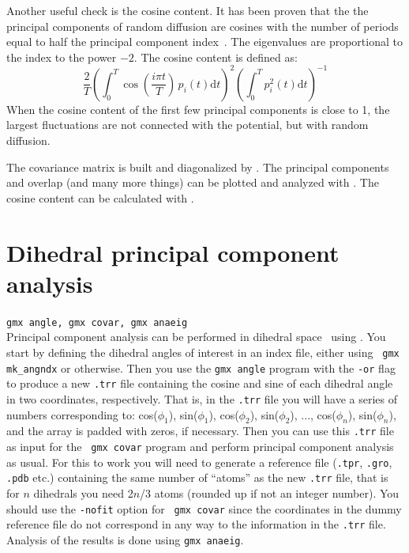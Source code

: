Another useful check is the cosine content. It has been proven that the
the principal components of random diffusion are cosines with the number of
periods equal to half the principal component index~\cite{Hess2000,Hess2002b}.
The eigenvalues are proportional to the index to the power $-2$.
The cosine content is defined as:
\begin{equation}
\frac{2}{T}
\left( \int_0^T \cos\left(\frac{i \pi t}{T}\right) \, p_i(t) \mbox{d} t \right)^2
\left( \int_0^T p_i^2(t) \mbox{d} t \right)^{-1}
\end{equation}
When the cosine content of the first few principal components
is close to 1, the largest fluctuations are not connected with
the potential, but with random diffusion.

The covariance matrix is built and diagonalized by
{\tt {}}.
The principal components and overlap (and many more things)
can be plotted and analyzed with {\tt {}}.
The cosine content can be calculated with {\tt {}}.



\section{Dihedral principal component analysis}
{\tt gmx angle, gmx covar, gmx anaeig}\\
Principal component analysis can be performed in dihedral
space~\cite{Mu2005a} using {\gromacs}. You start by defining the
dihedral angles of interest in an index file, either using {\tt
 gmx mk_angndx} or otherwise. Then you use the {\tt gmx angle} program
with the {\tt -or} flag to produce a new {\tt .trr} file containing the cosine and
sine of each dihedral angle in two coordinates, respectively. That is,
in the {\tt .trr} file you will have a series of numbers corresponding to:
cos($\phi_1$), sin($\phi_1$), cos($\phi_2$), sin($\phi_2$), ...,
cos($\phi_n$), sin($\phi_n$), and the array is padded with zeros, if
necessary.  Then you can use this {\tt .trr} file as input for the {\tt
 gmx covar} program and perform principal component analysis as usual.
For this to work you will need to generate a reference file ({\tt .tpr}, 
{\tt .gro}, {\tt .pdb} etc.) containing the same number of ``atoms'' 
as the new {\tt .trr} file, that is for $n$ dihedrals you need 2$n$/3 atoms 
(rounded up if not an integer number). 
You should use the {\tt -nofit} option for {\tt
gmx covar} since the coordinates in the dummy reference file do not
correspond in any way to the information in the {\tt .trr} file. Analysis of
the results is done using {\tt gmx anaeig}.

